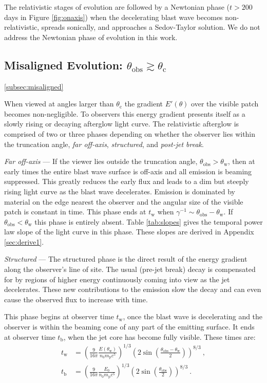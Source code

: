\documentclass[twocolumn]{aastex62}
\newcommand{\tW}{\ensuremath{t_{\mathrm{w}}}}
\newcommand{\tb}{\ensuremath{t_{\mathrm{b}}}}
\newcommand{\thobs}{\ensuremath{\theta_{\mathrm{obs}}}}
\newcommand{\thW}{\ensuremath{\theta_{\mathrm{w}}}}
\newcommand{\thC}{\ensuremath{\theta_{\mathrm{c}}}}
\newcommand{\Mp}{\ensuremath{m_{\mathrm{p}}}}
\begin{document}
The relativistic stages of evolution are followed by a Newtonian phase ($t > 200$ days in Figure \ref{fig:onaxis}) when the decelerating blast wave becomes non-relativistic, spreads sonically, and approaches a Sedov-Taylor solution.  We do not address the Newtonian phase of evolution in this work.

\subsection{Misaligned Evolution: $\thobs \gtrsim \thC$}\ref{subsec:misaligned}

When viewed at angles larger than $\thC$ the gradient $E'(\theta)$ over the visible patch becomes non-negligible.  To observers this energy gradient presents itself as a slowly rising or decaying afterglow light curve. The relativistic afterglow is comprised of two or three phases depending on whether the observer lies within the truncation angle, \emph{far off-axis}, \emph{structured}, and \emph{post-jet break}.

\emph{Far off-axis} --- If the viewer lies outside the truncation angle, $\thobs > \thW$, then at early times the entire blast wave surface is off-axis and all emission is beaming suppressed.  This greatly reduces the early flux and leads to a dim but steeply rising light curve as the blast wave decelerates.  Emission is dominated by material on the edge nearest the observer and the angular size of the visible patch is constant in time.  This phase ends at $\tW$ when $\gamma^{-1} \sim \thobs-\thW$.  If $\thobs < \thW$ this phase is entirely absent.  Table \ref{tab:slopes} gives the temporal power law slope of the light curve in this phase.  These slopes are derived in Appendix \ref{sec:derive1}.

\emph{Structured} --- The structured phase is the direct result of the energy gradient along the observer's line of site.  The usual (pre-jet break) decay is compensated for by regions of higher energy continuously coming into view as the jet decelerates.  These new contributions to the emission slow the decay and can even cause the observed flux to increase with time.

 This phase begins at observer time $\tW$, once the blast wave is decelerating and the observer is within the beaming cone of any part of the emitting surface.  It ends at observer time $\tb$, when the jet core has become fully visible.  These times are:
\begin{align}
	\tW &= \left(\frac{9}{16\pi} \frac{E(\thW)}{n_0 \Mp c^5}\right)^{1/3} \left( 2 \sin \left(\frac{\thobs-\thW}{2}\right)\right)^{8/3} \ ,\label{eq:tw} \\
	\tb &= \left(\frac{9}{16\pi} \frac{E_0}{n_0 \Mp c^5}\right)^{1/3} \left( 2 \sin \left(\frac{\thobs}{2}\right)\right)^{8/3} \ .\label{eq:tb}
\end{align}
\end{document}
